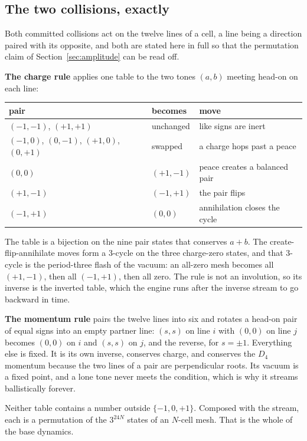 \subsection{The two collisions, exactly}

Both committed collisions act on the twelve lines of a cell, a line being a direction paired with its opposite, and
both are stated here in full so that the permutation claim of Section~\ref{sec:amplitude} can be read off.

\textbf{The charge rule} applies one table to the two tones $(a, b)$ meeting head-on on each line:

\begin{center}
\begin{tabular}{@{}lll@{}}
\toprule
pair & becomes & move \\
\midrule
$(-1,-1)$, $(+1,+1)$ & unchanged & like signs are inert \\
$(-1,0)$, $(0,-1)$, $(+1,0)$, $(0,+1)$ & swapped & a charge hops past a peace \\
$(0,0)$ & $(+1,-1)$ & peace creates a balanced pair \\
$(+1,-1)$ & $(-1,+1)$ & the pair flips \\
$(-1,+1)$ & $(0,0)$ & annihilation closes the cycle \\
\bottomrule
\end{tabular}
\end{center}

The table is a bijection on the nine pair states that conserves $a + b$. The create-flip-annihilate moves form a
3-cycle on the three charge-zero states, and that 3-cycle is the period-three flash of the vacuum: an all-zero
mesh becomes all $(+1,-1)$, then all $(-1,+1)$, then all zero. The rule is not an involution, so its inverse is the
inverted table, which the engine runs after the inverse stream to go backward in time.

\textbf{The momentum rule} pairs the twelve lines into six and rotates a head-on pair of equal signs into an empty
partner line: $(s, s)$ on line $i$ with $(0, 0)$ on line $j$ becomes $(0,0)$ on $i$ and $(s,s)$ on $j$, and the
reverse, for $s = \pm1$. Everything else is fixed. It is its own inverse, conserves charge, and conserves the $D_4$
momentum because the two lines of a pair are perpendicular roots. Its vacuum is a fixed point, and a lone tone never
meets the condition, which is why it streams ballistically forever.

Neither table contains a number outside $\{-1, 0, +1\}$. Composed with the stream, each is a permutation of the
$3^{24 N}$ states of an $N$-cell mesh. That is the whole of the base dynamics.
